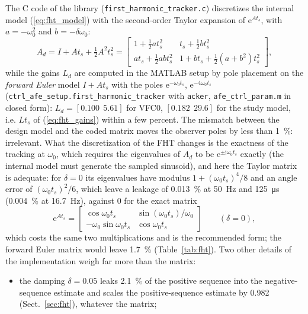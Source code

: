 \documentclass[10pt,a4paper]{scrartcl}
\newcommand{\ts}{t_s}
\newcommand{\wo}{\omega_0}
\newcommand{\jj}{\mathrm{j}}
\newcommand{\ee}{\mathrm{e}}
\newcommand{\code}[1]{\texttt{#1}}
\begin{document}
\begin{onehalfspace}
The C code of the library (\code{first\_harmonic\_tracker.c}) discretizes the internal model (\ref{eq:fht_model}) with the second-order Taylor expansion of $\ee^{A\ts}$, with $a = -\wo^2$ and $b = -\delta\wo$:
\begin{equation}
A_d = I + A\ts + \tfrac12 A^2\ts^2 = \begin{bmatrix} 1 + \tfrac12 a\ts^2 & \ts + \tfrac12 b\ts^2 \\ a\ts + \tfrac12 ab\ts^2 & 1 + b\ts + \tfrac12(a + b^2)\ts^2 \end{bmatrix},
\label{eq:fht_taylor}
\end{equation}
while the gains $L_d$ are computed in the MATLAB setup by pole placement on the \emph{forward Euler} model $I + A\ts$ with the poles $\ee^{-\wo\ts}$, $\ee^{-4\wo\ts}$ (\code{ctrl\_afe\_setup.first\_harmonic\_tracker} with \code{acker}, \code{afe\_ctrl\_param.m} in closed form): $L_d = [0.100\ \ 5.61]$ for VFC0, $[0.182\ \ 29.6]$ for the study model, i.e. $L\ts$ of (\ref{eq:fht_gains}) within a few percent. The mismatch between the design model and the coded matrix moves the observer poles by less than \SI{1}{\percent}: irrelevant. What the discretization of the FHT changes is the exactness of the tracking at $\wo$, which requires the eigenvalues of $A_d$ to be $\ee^{\pm\jj\wo\ts}$ exactly (the internal model must generate the sampled sinusoid), and here the Taylor matrix is adequate: for $\delta = 0$ its eigenvalues have modulus $1 + (\wo\ts)^4/8$ and an angle error of $(\wo\ts)^2/6$, which leave a leakage of \SI{0.013}{\percent} at \SI{50}{Hz} and \SI{125}{\micro s} (\SI{0.004}{\percent} at \SI{16.7}{Hz}), against 0 for the exact matrix
\begin{equation}
\ee^{A\ts} = \begin{bmatrix} \cos\wo\ts & \sin(\wo\ts)/\wo \\ -\wo\sin\wo\ts & \cos\wo\ts \end{bmatrix} \qquad (\delta = 0),
\label{eq:fht_exact}
\end{equation}
which costs the same two multiplications and is the recommended form; the forward Euler matrix would leave \SI{1.7}{\percent} (Table~\ref{tab:fht}). Two other details of the implementation weigh far more than the matrix:
\begin{itemize}
\item the damping $\delta = 0.05$ leaks \SI{2.1}{\percent} of the positive sequence into the negative-sequence estimate and scales the positive-sequence estimate by 0.982 (Sect.~\ref{sec:fht}), whatever the matrix;

\end{itemize}
\end{onehalfspace}
\end{document}
